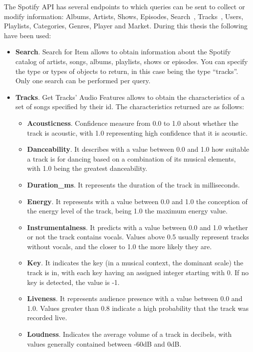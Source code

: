 \nonzeroparskip The Spotify API has several endpoints to which queries can be sent to collect or modify information: Albums, Artists, Shows, Episodes, Search~\cite{spotify_dev_endpoint_searchforitem}, Tracks~\cite{spotify_dev_endpoint_gettracksaudiofeatures}, Users, Playlists, Categories, Genres, Player and Market. During this thesis the following have been used:
\begin{itemize}
	\item \textbf{Search}. Search for Item allows to obtain information about the Spotify catalog of artists, songs, albums, playlists, shows or episodes. You can specify the type or types of objects to return, in this case being the type ``tracks''. Only one search can be performed per query.
	\item \textbf{Tracks}. Get Tracks' Audio Features allows to obtain the characteristics of a set of songs specified by their id. The characteristics returned are as follows:
	\begin{itemize}
		\item \textbf{Acousticness}. Confidence measure from 0.0 to 1.0 about whether the track is acoustic, with 1.0 representing high confidence that it is acoustic.
		\item \textbf{Danceability}. It describes with a value between 0.0 and 1.0 how suitable a track is for dancing based on a combination of its musical elements, with 1.0 being the greatest danceability.
		\item \textbf{Duration\_ms}. It represents the duration of the track in milliseconds.
		\item \textbf{Energy}. It represents with a value between 0.0 and 1.0 the conception of the energy level of the track, being 1.0 the maximum energy value.
		\item \textbf{Instrumentalness}. It predicts with a value between 0.0 and 1.0 whether or not the track contains vocals. Values above 0.5 usually represent tracks without vocals, and the closer to 1.0 the more likely they are.
		\item \textbf{Key}. It indicates the key (in a musical context, the dominant scale) the track is in, with each key having an assigned integer starting with 0. If no key is detected, the value is -1.
		\item \textbf{Liveness}. It represents audience presence with a value between 0.0 and 1.0. Values greater than 0.8 indicate a high probability that the track was recorded live.
		\item \textbf{Loudness}. Indicates the average volume of a track in decibels, with values generally contained between -60dB and 0dB.

\end{itemize}
\end{itemize}
